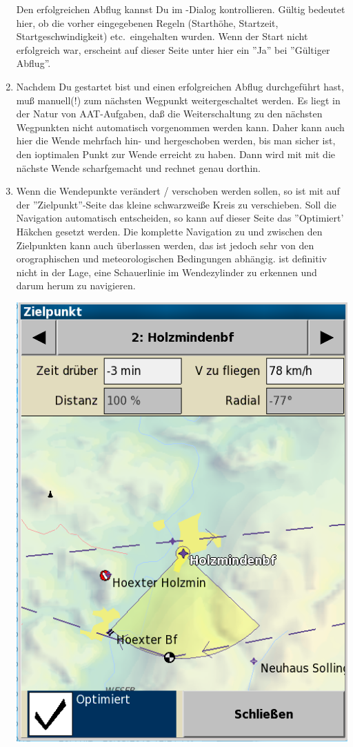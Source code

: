 \begin{enumerate}
Den erfolgreichen Abflug kannst Du im -Dialog kontrollieren.  Gültig bedeutet hier, ob die vorher eingegebenen
Regeln (Starthöhe, Startzeit, Startgeschwindigkeit) etc.\ eingehalten wurden.
Wenn der Start nicht erfolgreich war, erscheint auf dieser Seite unter  hier ein ''Ja'' bei ''Gültiger Abflug''.
\item  Nachdem Du gestartet bist und einen erfolgreichen Abflug durchgeführt hast, muß manuell(!) zum nächsten Wegpunkt weitergeschaltet
 werden.
 Es liegt in der Natur von AAT-Aufgaben, daß die Weiterschaltung zu den
nächsten Wegpunkten nicht automatisch vorgenommen werden kann.  Daher kann auch hier die Wende mehrfach hin- und hergeschoben werden, bis man sicher ist, den ioptimalen Punkt zur Wende erreicht zu haben.
Dann wird mit mit  die nächste Wende scharfgemacht und \xc rechnet genau dorthin.
\item Wenn die Wendepunkte verändert / verschoben werden sollen, so ist mit auf der ''Zielpunkt''-Seite  das kleine schwarzweiße Kreis zu verschieben.
 Soll \xc die Navigation automatisch entscheiden, so kann auf dieser Seite das ''Optimiert' Häkchen gesetzt werden.
Die komplette Navigation zu und zwischen den Zielpunkten kann auch \xc überlassen werden, das ist jedoch sehr
von den orographischen und meteorologischen Bedingungen  abhängig. \xc ist definitiv nicht in der Lage,
eine Schauerlinie im Wendezylinder zu erkennen und darum herum zu navigieren.
\begin{center}
\includegraphics[angle=0,width=0.75\linewidth,keepaspectratio='true']{figures/aat-area.png}

\end{center}
\end{enumerate}
